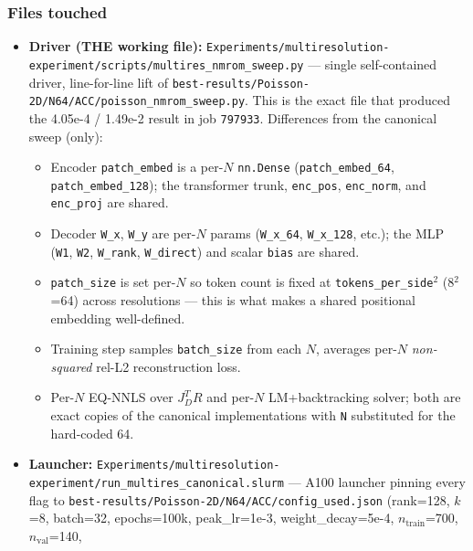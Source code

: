 \subsubsection*{Files touched}
\begin{itemize}
  \item \textbf{Driver (THE working file):}
        \texttt{Experiments/multiresolution-experiment/scripts/multires\_nmrom\_sweep.py}
        --- single self-contained driver, line-for-line lift of
        \texttt{best-results/Poisson-2D/N64/ACC/poisson\_nmrom\_sweep.py}.
        This is the exact file that produced the 4.05e-4 / 1.49e-2 result
        in job \texttt{797933}. Differences from the canonical sweep (only):
        \begin{itemize}
          \item Encoder \texttt{patch\_embed} is a per-$N$ \texttt{nn.Dense}
                (\texttt{patch\_embed\_64}, \texttt{patch\_embed\_128}); the
                transformer trunk, \texttt{enc\_pos}, \texttt{enc\_norm}, and
                \texttt{enc\_proj} are shared.
          \item Decoder \texttt{W\_x}, \texttt{W\_y} are per-$N$ params
                (\texttt{W\_x\_64}, \texttt{W\_x\_128}, etc.); the MLP
                (\texttt{W1}, \texttt{W2}, \texttt{W\_rank}, \texttt{W\_direct})
                and scalar \texttt{bias} are shared.
          \item \texttt{patch\_size} is set per-$N$ so token count is fixed at
                \texttt{tokens\_per\_side}$^2$ (8$^2$=64) across resolutions ---
                this is what makes a shared positional embedding well-defined.
          \item Training step samples \texttt{batch\_size} from each $N$,
                averages per-$N$ \emph{non-squared} rel-L2 reconstruction loss.
          \item Per-$N$ EQ-NNLS over $J_D^T R$ and per-$N$ LM+backtracking
                solver; both are exact copies of the canonical implementations
                with \texttt{N} substituted for the hard-coded 64.
        \end{itemize}
  \item \textbf{Launcher:}
        \texttt{Experiments/multiresolution-experiment/run\_multires\_canonical.slurm}
        --- A100 launcher pinning every flag to
        \texttt{best-results/Poisson-2D/N64/ACC/config\_used.json}
        (rank=128, $k$=8, batch=32, epochs=100k, peak\_lr=1e-3,
        weight\_decay=5e-4, $n_{\text{train}}$=700, $n_{\text{val}}$=140,

\end{itemize}
